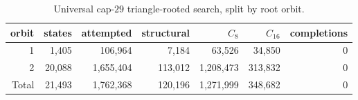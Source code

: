 \begin{table}[ht]
\centering
\small
\caption{Universal cap-$29$ triangle-rooted search, split by root orbit.}
\label{tab:triangle-orbits}
\begin{tabular}{rrrrrrr}
\toprule
orbit & states & attempted & structural & $C_8$ & $C_{16}$ & completions\\
\midrule
1 & 1,405 & 106,964 & 7,184 & 63,526 & 34,850 & 0\\
2 & 20,088 & 1,655,404 & 113,012 & 1,208,473 & 313,832 & 0\\
\midrule
Total & 21,493 & 1,762,368 & 120,196 & 1,271,999 & 348,682 & 0\\
\bottomrule
\end{tabular}
\end{table}

